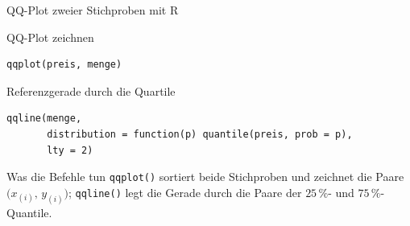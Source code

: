 \documentclass[aspectratio=169,11pt]{beamer}
\begin{document}
\begin{frame}[fragile]{QQ-Plot zweier Stichproben mit R}
  \begin{block}{QQ-Plot zeichnen}
\begin{lstlisting}
qqplot(preis, menge)
\end{lstlisting}
  \end{block}

  \begin{block}{Referenzgerade durch die Quartile}
\begin{lstlisting}
qqline(menge,
       distribution = function(p) quantile(preis, prob = p),
       lty = 2)
\end{lstlisting}
  \end{block}

  \begin{exampleblock}{Was die Befehle tun}
    \texttt{qqplot()} sortiert beide Stichproben und zeichnet die Paare
    $\bigl(x_{(i)},\,y_{(i)}\bigr)$; \texttt{qqline()} legt die Gerade durch die
    Paare der $25\,\%$- und $75\,\%$-Quantile.
  \end{exampleblock}
\end{frame}
\end{document}
